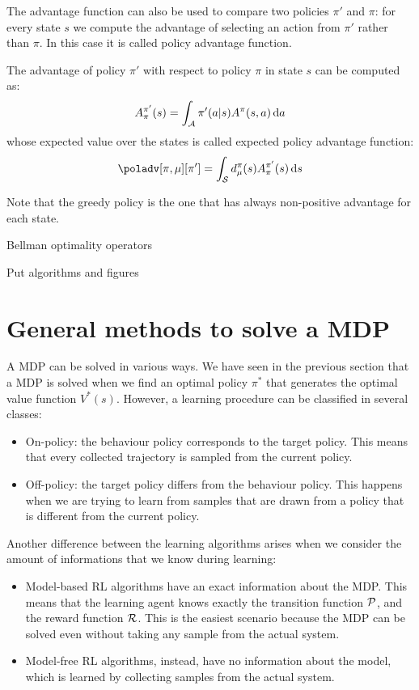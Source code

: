 The advantage function can also be used to compare two policies $\pi'$ and $\pi$: for every state $s$ we compute the advantage of selecting an action from $\pi'$ rather than $\pi$. In this case it is called policy advantage function.
\begin{definition}
The advantage of policy $\pi'$ with respect to policy $\pi$ in state $s$ can be computed as:
\[
A_\pi^{\pi'}(s) = \int_{\mathcal{A}} \pi'(a|s)A^\pi(s, a) \, \textrm{d} a
\]
whose expected value over the states is called expected policy advantage function:
\[
\poladv[\pi,\mu][\pi'] = \int_{\sspace} d_\mu^{\pi}(s)A_\pi^{\pi'}(s) \de s
\]
\end{definition}


Note that the greedy policy is the one that has always non-positive advantage for each state. 


Bellman optimality operators

Put algorithms and figures

\section{General methods to solve a MDP}
\label{sec:solve-mdp}
A MDP can be solved in various ways. We have seen in the previous section that a MDP is solved when we find an optimal policy $\pi^*$ that generates the optimal value function $V^*(s)$. However, a learning procedure can be classified in several classes:
\begin{itemize}
\item On-policy: the behaviour policy corresponds to the target policy. This means that every collected trajectory is sampled from the current policy.
\item Off-policy: the target policy differs from the behaviour policy. This happens when we are trying to learn from samples that are drawn from a policy that is different from the current policy.
\end{itemize}

Another difference between the learning algorithms arises when we consider the amount of informations that we know during learning:
\begin{itemize}
\item Model-based RL algorithms have an exact information about the MDP. This means that the learning agent knows exactly the transition function $\mathcal{P}$, and the reward function $\mathcal{R}$. This is the easiest scenario because the MDP can be solved even without taking any sample from the actual system.
\item Model-free RL algorithms, instead, have no information about the model, which is learned by collecting samples from the actual system.
\end{itemize}

